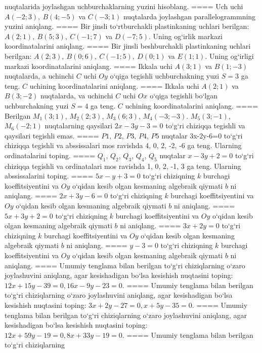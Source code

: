 nuqtalarida joylashgan uchburchaklarning yuzini hisoblang.
====
Uch uchi $A (-2;3), \ B (4;-5) $ va
$C (-3;1)$ nuqtalarda joylashgan parallelogrammning yuzini aniqlang.
====
Bir jinsli to‘rtburchakli plastinkaning uchlari berilgan:
$A (2;1), \ B (5;3), \ C (-1;7) $ va $D (-7;5) $. Uning og‘irlik markazi
koordinatalarini aniqlang.
====
Bir jinsli beshburchakli plastinkaning uchlari berilgan:
$A (2;3), \ B (0;6), \ C (-1;5), \ D (0;1) $ va $E (1;1) $. Uning og‘irligi
markazi koordinatalarini aniqlang.
====
Ikkala uchi $A (3;1) $ va $B (1;-3) $ nuqtalarda, a
uchinchi $C$ uchi $Oy$ o‘qiga tegishli uchburchakning
yuzi $S=3$ ga teng. $C$ uchining koordinatalarini aniqlang.
====
Ikkala uchi $A (2;1) $ va $B (3;-2) $ nuqtalarda, va
uchinchi $C$ uchi $Ox$ o‘qiga tegishli bo‘lgan uchburchakning
yuzi $S=4$ ga teng. $C$ uchining koordinatalarini aniqlang.
====
Berilgan $M_1 (3; 1) $, $M_2 (2; 3) $, $M_3 (6; 3) $,
$M_4 (-3;-3) $. $M_5 (3;-1) $, $M_6 (-2; 1) $ nuqtalarning qaysilari
$2x-3y-3 = 0$ to‘g‘ri chiziqqa tegishli va qaysilari tegishli
emas.
====
$P1$, $P2$, $P3$, $P4$, $P5$ nuqtalar
3x-2y-6=0 to‘g‘ri chiziqqa tegishli va abssissalari mos ravishda
4, 0, 2, -2, -6 ga teng. Ularning ordinatalarini toping.
====
$Q_1$, $Q_2$, $Q_3$, $Q_4$, $Q_5$ nuqtalar
$x-3y+2=0$ to‘g‘ri chiziqqa tegishli va ordinatalari mos ravishda
1, 0, 2, -1, 3 ga teng. Ularning abssissalarini toping.
====
$5x-y+3=0$ to‘g‘ri chiziqning $k$ burchagi
koeffitsiyentini va $Oy$ o‘qidan kesib olgan kesmaning algebraik
qiymati $b$ ni aniqlang.
====
$2x+3y-6=0$ to‘g‘ri chiziqning $k$ burchagi
koeffitsiyentini va $Oy$ o‘qidan kesib olgan kesmaning algebraik
qiymati $b$ ni aniqlang.
====
$5x+3y+2=0$ to‘g‘ri chiziqning $k$ burchagi
koeffitsiyentini va $Oy$ o‘qidan kesib olgan kesmaning algebraik
qiymati $b$ ni aniqlang.
====
$3x+2y=0$ to‘g‘ri chiziqning $k$ burchagi
koeffitsiyentini va $Oy$ o‘qidan kesib olgan kesmaning algebraik
qiymati $b$ ni aniqlang.
====
$y-3=0$ to‘g‘ri chiziqning $k$ burchagi
koeffitsiyentini va $Oy$ o‘qidan kesib olgan kesmaning algebraik
qiymati $b$ ni aniqlang.
====
Umumiy tenglama bilan berilgan to‘g‘ri chiziqlarning
o‘zaro joylashuvini aniqlang, agar kesishadigan bo‘lsa kesishish nuqtasini
toping: $12x+15y-39=0, 16x-9y-23=0$.
====
Umumiy tenglama bilan berilgan to‘g‘ri chiziqlarning
o‘zaro joylashuvini aniqlang, agar kesishadigan bo‘lsa kesishish nuqtasini
toping: $3x+2y-27=0, x+5y-35=0$.
====
Umumiy tenglama bilan berilgan to‘g‘ri chiziqlarning
o‘zaro joylashuvini aniqlang, agar kesishadigan bo‘lsa kesishish nuqtasini
toping: $12x+59y-19=0, 8x+33y-19=0$.
====
Umumiy tenglama bilan berilgan to‘g‘ri chiziqlarning
